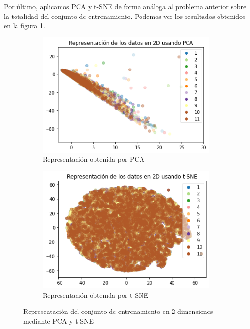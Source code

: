 \documentclass[10pt,a4paper]{article}
\begin{document}
Por último, aplicamos PCA y t-SNE de forma análoga al problema anterior sobre la totalidad del conjunto de entrenamiento. Podemos ver los resultados obtenidos en la figura \ref{fig:cla_pca_tsne}.

\begin{figure}[h]
	\begin{subfigure}{0.5\textwidth}
		\centering
		\includegraphics[width=\textwidth]{cla_pca}
		\caption{Representación obtenida por PCA}
	\end{subfigure}
	\begin{subfigure}{0.5\textwidth}
		\centering
		\includegraphics[width=\textwidth]{cla_tsne}
		\caption{Representación obtenida por t-SNE}
	\end{subfigure}
	\caption{Representación del conjunto de entrenamiento en 2 dimensiones mediante PCA y t-SNE}
	\label{fig:cla_pca_tsne}
\end{figure}
\end{document}
